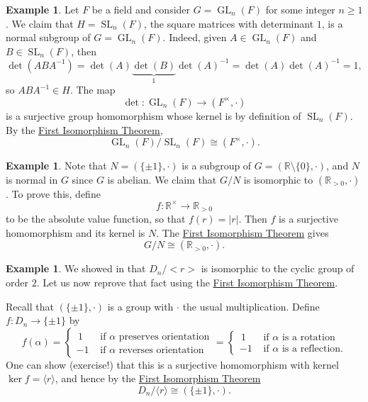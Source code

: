 \documentclass[12pt]{report}
\numberwithin{equation}{section}
\numberwithin{theorem}{chapter}
\theoremstyle{definition}
\newtheorem{example}[theorem]{Example}
\newtheorem*{basic properties}{Basic Properties}
\newtheorem*{Important Remark}{Important Remark}
\DeclareMathOperator{\GL}{GL}
\DeclareMathOperator{\SL}{SL}
\renewcommand{\ker}{\operatorname{ker}}
\begin{document}
\begin{example}\label{SLn is normal}
Let $F$ be a field and consider $G = \GL_n(F)$ for some integer $n \geqslant 1$. 
We claim that $H = \SL_n(F)$, the square matrices with determinant $1$, is a normal subgroup of $G = \GL_n(F)$. Indeed, given $A \in \GL_n(F)$ and $B \in \SL_n(F)$, then
$$\det(ABA^{-1}) = \det(A) \underset{1}{\underbrace{\det(B)}} \det(A)^{-1} = \det(A) \det(A)^{-1} = 1,$$ 
so $ABA^{-1} \in H$. %
The map 
$$\det\!: \GL_n(F) \to (F^\times, \cdot)$$ 
is a surjective group homomorphism whose kernel is by definition of $\SL_n(F)$. By the \hyperref[first iso thm]{First Isomorphism Theorem}, 
$$\GL_n(F)/\SL_n(F) \cong (F^\times, \cdot).$$ 
\end{example}



\begin{example} 
Note that $N = (\{\pm 1 \}, \cdot)$ is a subgroup of $G = (\mathbb{R} \setminus \{0\}, \cdot)$, and $N$ is normal in $G$ since $G$ is abelian. We claim that $G/N$ is isomorphic to $(\mathbb{R}_{>0}, \cdot)$. To prove this, define 
$$f\!: \mathbb{R}^\times \to \mathbb{R}_{>0}$$ 
to be the absolute value function, so that $f(r) = |r|$.
Then $f$ is a surjective homomorphism and its kernel is $N$. The \hyperref[first iso thm]{First Isomorphism Theorem} gives
$$G/N \cong (\mathbb{R}_{>0}, \cdot).$$
\end{example}


\begin{example} 
We showed in  that $D_n/<r>$ is isomorphic to the cyclic group of order $2$. Let us now reprove that fact using the \hyperref[first iso thm]{First Isomorphism Theorem}.

Recall that $(\{\pm 1\}, \cdot)$ is a group with $\cdot$ the usual multiplication. Define $f\!: D_{n} \longrightarrow \{\pm 1\}$ by 
$$f(\alpha) = \begin{cases}
	\, 1 & \textrm{ if $\alpha$ preserves orientation} \\
	-1 & \textrm{ if $\alpha$ reverses orientation} 
\end{cases}
=
\begin{cases}
	\, 1 & \textrm{ if $\alpha$ is a rotation} \\
	-1 & \textrm{ if $\alpha$ is a reflection}. 
\end{cases}$$
One can show (exercise!) that this is a surjective homomorphism with kernel $\ker f = \langle r \rangle$, and hence by the \hyperref[first iso thm]{First Isomorphism Theorem}
$$D_{n}/\langle r \rangle \cong (\{\pm 1\}, \cdot).$$
\end{example}
\end{document}

